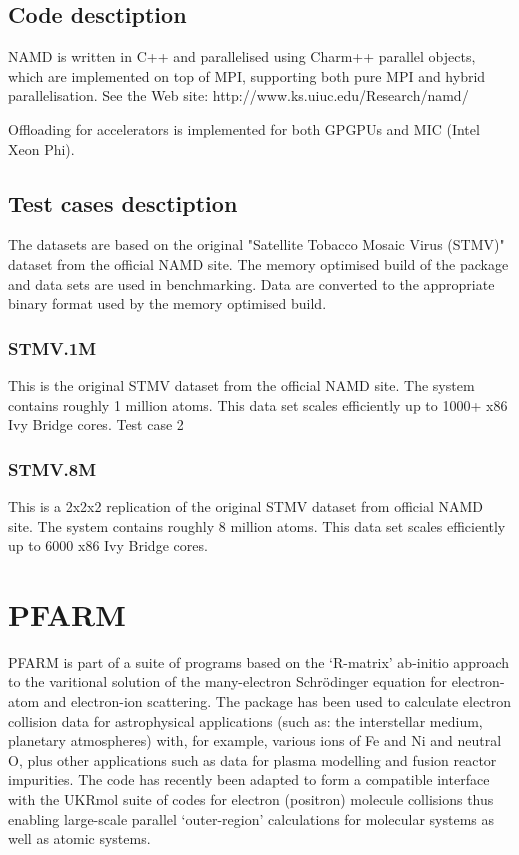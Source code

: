\subsection{Code desctiption}
NAMD is written in C++ and parallelised using Charm++ parallel objects, which are implemented on top of MPI, supporting both pure MPI and hybrid parallelisation.
See the Web site: http://www.ks.uiuc.edu/Research/namd/

Offloading for accelerators is implemented for both GPGPUs and MIC (Intel Xeon Phi).

\subsection{Test cases desctiption}
The datasets are based on the original "Satellite Tobacco Mosaic Virus (STMV)" dataset from the official NAMD site. The memory optimised build of the package and data sets are used in benchmarking. Data are converted to the appropriate binary format used by the memory optimised build.

\subsubsection{STMV.1M}
This is the original STMV dataset from the official NAMD site. The system contains roughly 1 million atoms. This data set scales efficiently up to 1000+ x86 Ivy Bridge cores.
Test case 2

\subsubsection{STMV.8M}
This is a 2x2x2 replication of the original STMV dataset from official NAMD site. The system contains roughly 8 million atoms. This data set scales efficiently up to 6000 x86 Ivy Bridge cores.

\section{PFARM}
PFARM is part of a suite of programs based on the ‘R-matrix’ ab-initio approach to the varitional solution of the many-electron Schrödinger equation for electron-atom and electron-ion scattering. The package has been used to calculate electron collision data for astrophysical applications (such as: the interstellar medium, planetary atmospheres) with, for example, various ions of Fe and Ni and neutral O, plus other applications such as data for plasma modelling and fusion reactor impurities. The code has recently been adapted to form a compatible interface with the UKRmol suite of codes for electron (positron) molecule collisions thus enabling large-scale parallel ‘outer-region’ calculations for molecular systems as well as atomic systems.

